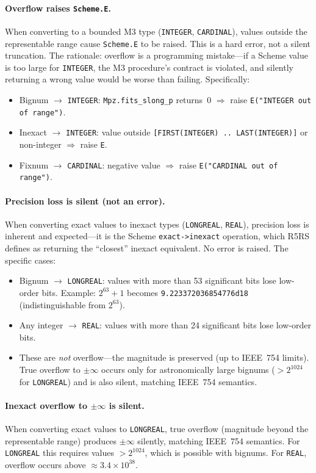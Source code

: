 \documentclass[12pt]{article}
\begin{document}
\paragraph{Overflow raises {\tt Scheme.E}.}
When converting to a bounded M3 type ({\tt INTEGER},
{\tt CARDINAL}), values outside the representable range cause
{\tt Scheme.E} to be raised.  This is a hard error, not a silent
truncation.  The rationale: overflow is a programming mistake---if
a Scheme value is too large for {\tt INTEGER}, the M3 procedure's
contract is violated, and silently returning a wrong value would
be worse than failing.  Specifically:
\begin{itemize}[nosep]
\item Bignum $\to$ {\tt INTEGER}: {\tt Mpz.fits\_slong\_p}
  returns~0 $\Rightarrow$ raise {\tt E("INTEGER out of range")}.
\item Inexact $\to$ {\tt INTEGER}: value outside
  {\tt [FIRST(INTEGER) .. LAST(INTEGER)]} or non-integer
  $\Rightarrow$ raise {\tt E}.
\item Fixnum $\to$ {\tt CARDINAL}: negative value $\Rightarrow$
  raise {\tt E("CARDINAL out of range")}.
\end{itemize}

\paragraph{Precision loss is silent (not an error).}
When converting exact values to inexact types ({\tt LONGREAL},
{\tt REAL}), precision loss is inherent and expected---it is the
Scheme {\tt exact->inexact} operation, which R5RS defines as
returning the ``closest'' inexact equivalent.  No error is raised.
The specific cases:
\begin{itemize}[nosep]
\item Bignum $\to$ {\tt LONGREAL}: values with more than 53
  significant bits lose low-order bits.  Example:
  $2^{63} + 1$ becomes {\tt 9.223372036854776d18}
  (indistinguishable from $2^{63}$).
\item Any integer $\to$ {\tt REAL}: values with more than 24
  significant bits lose low-order bits.
\item These are \emph{not} overflow---the magnitude is preserved
  (up to IEEE~754 limits).  True overflow to $\pm\infty$ occurs
  only for astronomically large bignums ($> 2^{1024}$ for
  {\tt LONGREAL}) and is also silent, matching IEEE~754 semantics.
\end{itemize}

\paragraph{Inexact overflow to $\pm\infty$ is silent.}
When converting exact values to {\tt LONGREAL}, true overflow
(magnitude beyond the representable range) produces $\pm\infty$
silently, matching IEEE~754 semantics.  For {\tt LONGREAL} this
requires values $> 2^{1024}$, which is possible with bignums.
For {\tt REAL}, overflow occurs above $\approx 3.4 \times 10^{38}$.
\end{document}
